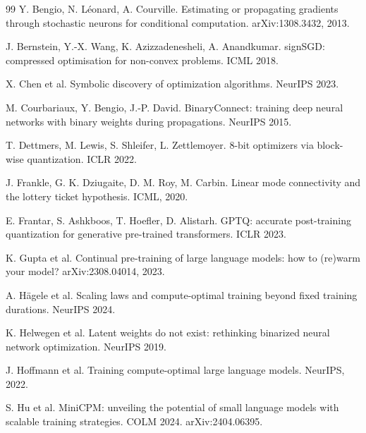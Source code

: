 \documentclass[10pt,twocolumn]{article}
\begin{document}
\clearpage

\begin{thebibliography}{99}
 Y. Bengio, N. L\'eonard, A. Courville. Estimating or propagating
  gradients through stochastic neurons for conditional computation. arXiv:1308.3432, 2013.

 J. Bernstein, Y.-X. Wang, K. Azizzadenesheli, A. Anandkumar.
  signSGD: compressed optimisation for non-convex problems. ICML 2018.

 X. Chen et al. Symbolic discovery of optimization algorithms. NeurIPS 2023.

 M. Courbariaux, Y. Bengio, J.-P. David. BinaryConnect:
  training deep neural networks with binary weights during propagations. NeurIPS 2015.

 T. Dettmers, M. Lewis, S. Shleifer, L. Zettlemoyer. 8-bit
  optimizers via block-wise quantization. ICLR 2022.

 J. Frankle, G. K. Dziugaite, D. M. Roy, M. Carbin. Linear mode
  connectivity and the lottery ticket hypothesis. ICML, 2020.

 E. Frantar, S. Ashkboos, T. Hoefler, D. Alistarh. GPTQ: accurate
  post-training quantization for generative pre-trained transformers. ICLR 2023.

 K. Gupta et al. Continual pre-training of large language models: how to
  (re)warm your model? arXiv:2308.04014, 2023.

 A. H\"agele et al. Scaling laws and compute-optimal training beyond
  fixed training durations. NeurIPS 2024.

 K. Helwegen et al. Latent weights do not exist: rethinking binarized
  neural network optimization. NeurIPS 2019.

 J. Hoffmann et al. Training compute-optimal large language
  models. NeurIPS, 2022.

 S. Hu et al. MiniCPM: unveiling the potential of small language models with
  scalable training strategies. COLM 2024. arXiv:2404.06395.


\end{thebibliography}
\end{document}
